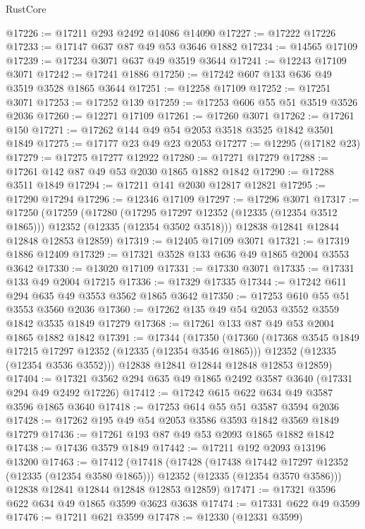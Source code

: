 \begin{lexlean}{RustCore}
\begin{coremodule}
@17226 := @17211 @293 @2492 @14086 @14090
@17227 := @17222 @17226
@17233 := @17147 @637 @87 @49 @53 @3646 @1882
@17234 := @14565 @17109
@17239 := @17234 @3071 @637 @49 @3519 @3644
@17241 := @12243 @17109 @3071
@17242 := @17241 @1886
@17250 := @17242 @607 @133 @636 @49 @3519 @3528 @1865 @3644
@17251 := @12258 @17109
@17252 := @17251 @3071
@17253 := @17252 @139
@17259 := @17253 @606 @55 @51 @3519 @3526 @2036
@17260 := @12271 @17109
@17261 := @17260 @3071
@17262 := @17261 @150
@17271 := @17262 @144 @49 @54 @2053 @3518 @3525 @1842 @3501 @1849
@17275 := @17177 @23 @49 @23 @2053
@17277 := @12295 (@17182 @23)
@17279 := @17275 @17277 @12922
@17280 := @17271 @17279
@17288 := @17261 @142 @87 @49 @53 @2030 @1865 @1882 @1842
@17290 := @17288 @3511 @1849
@17294 := @17211 @141 @2030 @12817 @12821
@17295 := @17290 @17294
@17296 := @12346 @17109
@17297 := @17296 @3071
@17317 := @17250
    (@17259
      (@17280
        (@17295 @17297 @12352 (@12335 (@12354 @3512 @1865)))
        @12352
        (@12335 (@12354 @3502 @3518)))
      @12838
      @12841
      @12844
      @12848
      @12853
      @12859)
@17319 := @12405 @17109 @3071
@17321 := @17319 @1886 @12409
@17329 := @17321 @3528 @133 @636 @49 @1865 @2004 @3553 @3642
@17330 := @13020 @17109
@17331 := @17330 @3071
@17335 := @17331 @133 @49 @2004 @17215
@17336 := @17329 @17335
@17344 := @17242 @611 @294 @635 @49 @3553 @3562 @1865 @3642
@17350 := @17253 @610 @55 @51 @3553 @3560 @2036
@17360 := @17262 @135 @49 @54 @2053 @3552 @3559 @1842 @3535 @1849 @17279
@17368 := @17261 @133 @87 @49 @53 @2004 @1865 @1882 @1842
@17391 := @17344
    (@17350
      (@17360
        (@17368 @3545 @1849 @17215 @17297 @12352 (@12335 (@12354 @3546 @1865)))
        @12352
        (@12335 (@12354 @3536 @3552)))
      @12838
      @12841
      @12844
      @12848
      @12853
      @12859)
@17404 := @17321 @3562 @294 @635 @49 @1865 @2492 @3587 @3640 (@17331 @294 @49 @2492 @17226)
@17412 := @17242 @615 @622 @634 @49 @3587 @3596 @1865 @3640
@17418 := @17253 @614 @55 @51 @3587 @3594 @2036
@17428 := @17262 @195 @49 @54 @2053 @3586 @3593 @1842 @3569 @1849 @17279
@17436 := @17261 @193 @87 @49 @53 @2093 @1865 @1882 @1842
@17438 := @17436 @3579 @1849
@17442 := @17211 @192 @2093 @13196 @13200
@17463 := @17412
    (@17418
      (@17428
        (@17438 @17442 @17297 @12352 (@12335 (@12354 @3580 @1865)))
        @12352
        (@12335 (@12354 @3570 @3586)))
      @12838
      @12841
      @12844
      @12848
      @12853
      @12859)
@17471 := @17321 @3596 @622 @634 @49 @1865 @3599 @3623 @3638
@17474 := @17331 @622 @49 @3599
@17476 := @17211 @621 @3599
@17478 := @12330 (@12331 @3599)

\end{coremodule}
\end{lexlean}
